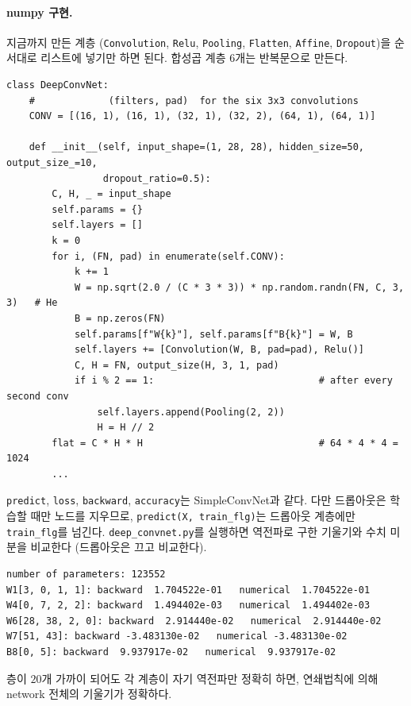 \documentclass[11pt,a4paper]{article}
\begin{document}
\paragraph{numpy 구현.}
지금까지 만든 계층 (\texttt{Convolution}, \texttt{Relu}, \texttt{Pooling}, \texttt{Flatten}, \texttt{Affine}, \texttt{Dropout})을
순서대로 리스트에 넣기만 하면 된다. 합성곱 계층 $6$개는 반복문으로 만든다.

\begin{lstlisting}
class DeepConvNet:
    #             (filters, pad)  for the six 3x3 convolutions
    CONV = [(16, 1), (16, 1), (32, 1), (32, 2), (64, 1), (64, 1)]

    def __init__(self, input_shape=(1, 28, 28), hidden_size=50, output_size_=10,
                 dropout_ratio=0.5):
        C, H, _ = input_shape
        self.params = {}
        self.layers = []
        k = 0
        for i, (FN, pad) in enumerate(self.CONV):
            k += 1
            W = np.sqrt(2.0 / (C * 3 * 3)) * np.random.randn(FN, C, 3, 3)   # He
            B = np.zeros(FN)
            self.params[f"W{k}"], self.params[f"B{k}"] = W, B
            self.layers += [Convolution(W, B, pad=pad), Relu()]
            C, H = FN, output_size(H, 3, 1, pad)
            if i % 2 == 1:                             # after every second conv
                self.layers.append(Pooling(2, 2))
                H = H // 2
        flat = C * H * H                               # 64 * 4 * 4 = 1024
        ...
\end{lstlisting}

\texttt{predict}, \texttt{loss}, \texttt{backward}, \texttt{accuracy}는 SimpleConvNet과 같다.
다만 드롭아웃은 학습할 때만 노드를 지우므로, \texttt{predict(X, train\_flg)}는
드롭아웃 계층에만 \texttt{train\_flg}를 넘긴다.
\texttt{deep\_convnet.py}를 실행하면 역전파로 구한 기울기와 수치 미분을 비교한다 (드롭아웃은 끄고 비교한다).

\begin{lstlisting}[language={},numbers=none]
number of parameters: 123552
W1[3, 0, 1, 1]: backward  1.704522e-01   numerical  1.704522e-01
W4[0, 7, 2, 2]: backward  1.494402e-03   numerical  1.494402e-03
W6[28, 38, 2, 0]: backward  2.914440e-02   numerical  2.914440e-02
W7[51, 43]: backward -3.483130e-02   numerical -3.483130e-02
B8[0, 5]: backward  9.937917e-02   numerical  9.937917e-02
\end{lstlisting}

층이 $20$개 가까이 되어도 각 계층이 자기 역전파만 정확히 하면, 연쇄법칙에 의해 network 전체의 기울기가 정확하다.
\end{document}
